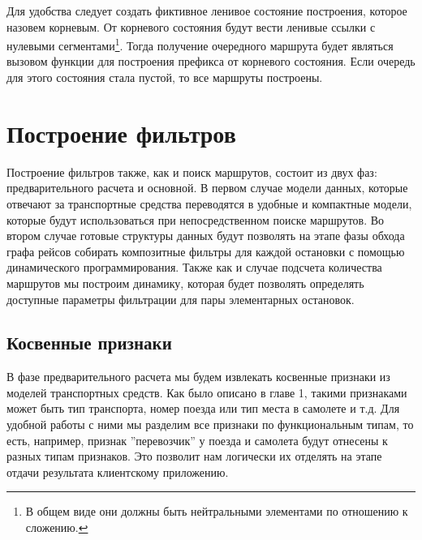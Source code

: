 Для удобства следует создать фиктивное ленивое состояние построения, которое назовем корневым. От корневого состояния будут вести ленивые ссылки с нулевыми сегментами\footnote{В общем виде они должны быть нейтральными элементами по отношению к сложению.}. Тогда получение очередного маршрута будет являться вызовом функции для построения префикса от корневого состояния. Если очередь для этого состояния стала пустой, то все маршруты построены.

\section{Построение фильтров}
Построение фильтров также, как и поиск маршрутов, состоит из двух фаз: предварительного расчета и основной. В первом случае модели данных, которые отвечают за транспортные средства переводятся в удобные и компактные модели, которые будут использоваться при непосредственном поиске маршрутов. Во втором случае готовые структуры данных будут позволять на этапе фазы обхода графа рейсов собирать композитные фильтры для каждой остановки с помощью динамического программирования. Также как и случае подсчета количества маршрутов мы построим динамику, которая будет позволять определять доступные параметры фильтрации для пары элементарных остановок.

\subsection{Косвенные признаки}
В фазе предварительного расчета мы будем извлекать косвенные признаки из моделей транспортных средств. Как было описано в главе 1, такими признаками может быть тип транспорта, номер поезда или тип места в самолете и т.д. Для удобной работы с ними мы разделим все признаки по функциональным типам, то есть, например, признак ''перевозчик'' у поезда и самолета будут отнесены к разных типам признаков. Это позволит нам логически их отделять на этапе отдачи результата клиентскому приложению.

